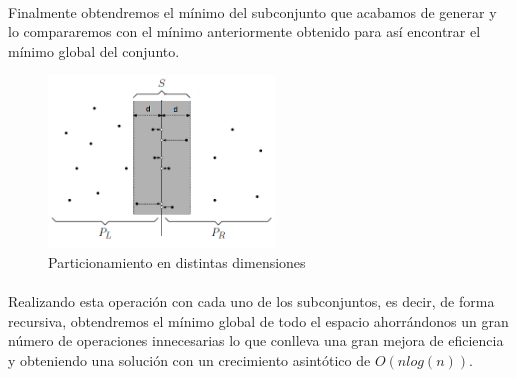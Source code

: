 \documentclass{article}
\begin{document}
			\paragraph{}
			Finalmente obtendremos el mínimo del subconjunto que acabamos de generar y lo compararemos con el mínimo anteriormente obtenido para así encontrar el mínimo global del conjunto.

			\begin{figure}[ht!]
				\centering
				\includegraphics[width=60mm]{strip_closesr1.png}
				\caption{Particionamiento en distintas dimensiones \label{example_border}}
			\end{figure}
			
		
	\paragraph{}
	Realizando esta operación con cada uno de los subconjuntos, es decir, de forma recursiva,  obtendremos el mínimo global de todo el espacio ahorrándonos un gran número de operaciones innecesarias lo que conlleva una gran mejora de eficiencia y obteniendo una solución con un crecimiento asintótico de $O(nlog(n))$.
\end{document}
